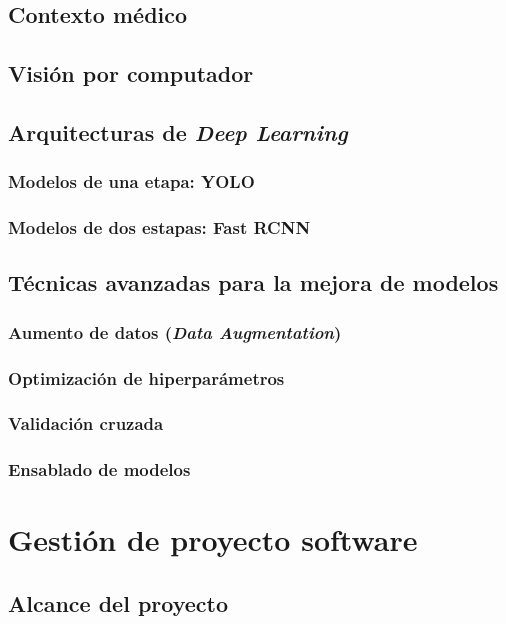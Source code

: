 \documentclass[12pt,a4paper,onecolumn,oneside]{report}
\begin{document}
\section{Contexto médico}

\section{Visión por computador}
\section{Arquitecturas de \textit{Deep Learning}}
\subsection{Modelos de una etapa: YOLO}
\subsection{Modelos de dos estapas: Fast RCNN}

\section{Técnicas avanzadas para la mejora de modelos}
\subsection{Aumento de datos (\textit{Data Augmentation})}
\subsection{Optimización de hiperparámetros}
\subsection{Validación cruzada}
\subsection{Ensablado de modelos}


\chapter{Gestión de proyecto software}
\label{Gestión de proyecto software}



\section{Alcance del proyecto}
\label{Alcance del proyecto}
\end{document}
